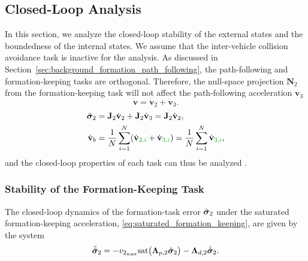 \subsection{Closed-Loop Analysis}\label{sec:closed_loop}
In this section, we analyze the closed-loop stability of the external states and the boundedness of the internal states. We assume that the inter-vehicle collision avoidance task is inactive for the analysis. As discussed in Section~\ref{sec:background_formation_path_following}, the path-following and formation-keeping tasks are orthogonal. Therefore, the null-space projection $\mathbf{N}_2$ from the formation-keeping task will not affect the path-following acceleration $\mathbf{v}_3$
\begin{equation}\label{eq:commanded_acceleration_inactive_colav}
    \dot{\mathbf{v}} = \dot{\mathbf{v}}_2 + \dot{\mathbf{v}}_3.
\end{equation}
\begin{align}
    \ddot{\bm{\sigma}}_2 &= \mathbf{J}_2\dot{\mathbf{v}}_2 + \mathbf{J}_2\dot{\mathbf{v}}_3 = \mathbf{J}_2\dot{\mathbf{v}}_2,\\
    \dot{\mathbf{v}}_b &= \frac{1}{N}\sum_{i=1}^N (\dot{\mathbf{v}}_{\dm{2,i}} + \dot{\mathbf{v}}_{\dm{3,i}}) = \frac{1}{N}\sum_{i=1}^N \dot{\mathbf{v}}_{\dm{3,i}},
\end{align}
and the closed-loop properties of each task can thus be analyzed .


\subsubsection{Stability of the Formation-Keeping Task}
The closed-loop dynamics of the formation-task error $\Tilde{\bm{\sigma}}_2$ under the saturated formation-keeping acceleration, \eqref{eq:saturated_formation_keeping}, are given by the system
\begin{equation}\label{eq:task_2_dynamics}
    \ddot{\Tilde{\bm{\sigma}}}_2 = - v_{2_{\max}}\mathrm{sat}\bigl(\mathbf{\Lambda}_{p,2}\Tilde{\bm{\sigma}}_2\bigr) - \mathbf{\Lambda}_{d,2} \dot{\Tilde{\bm{\sigma}}}_2.
\end{equation}

